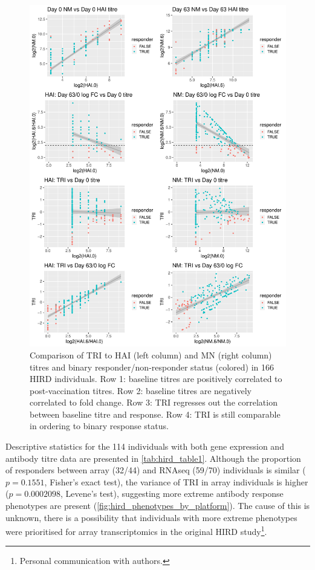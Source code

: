\begin{figure}
    \includegraphics[width=1.0\textwidth]{mainmatter/figures/chapter_02/phenotype_data_setup.tri_comparison.pdf}
    \caption{Comparison of \gls{TRI} to \gls{HAI} (left column) and \gls{MN} (right column) titres and binary responder/non-responder status (colored) in 166 \gls{HIRD} individuals. Row 1: baseline titres are positively correlated to post-vaccination titres. Row 2: baseline titres are negatively correlated to fold change. Row 3: \gls{TRI} regresses out the correlation between baseline titre and response. Row 4: \gls{TRI} is still comparable in ordering to binary response status.}
    \label{fig:hird_tri}
\end{figure} 

Descriptive statistics for the 114 individuals with both gene expression and antibody titre data are presented in \cref{tab:hird_table1}.
Although the proportion of responders between array (32/44) and \gls{RNAseq} (59/70) individuals is similar ($p = 0.1551$, Fisher's exact test), the variance of \gls{TRI} in array individuals is higher ($p = 0.0002098$, Levene's test), suggesting more extreme antibody response phenotypes are present (\cref{fig:hird_phenotypes_by_platform}).
The cause of this is unknown, there is a possibility that individuals with more extreme phenotypes were prioritised for array transcriptomics in the original \gls{HIRD} study\footnote{Personal communication with authors.}.

